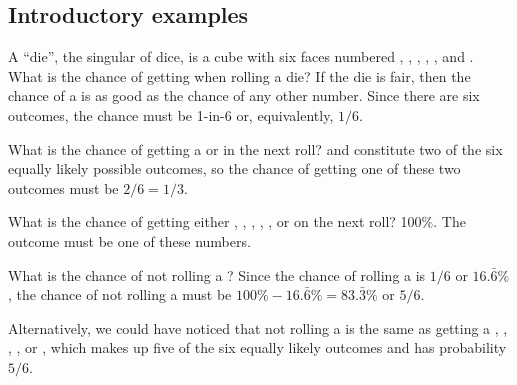 \subsection{Introductory examples}

\begin{examplewrap}
\begin{nexample}{A ``die'', the singular of dice, is a cube with six faces numbered , , , , , and . What is the chance of getting  when rolling a die?}\label{probOf1}
If the die is fair, then the chance of a  is as good as the chance of any other number. Since there are six outcomes, the chance must be 1-in-6 or, equivalently, $1/6$.
\end{nexample}
\end{examplewrap}

\begin{examplewrap}
\begin{nexample}{What is the chance of getting a  or  in the next roll?}\label{probOf1Or2}
 and  constitute two of the six equally likely possible outcomes, so the chance of getting one of these two outcomes must be $2/6 = 1/3$.
\end{nexample}
\end{examplewrap}

\begin{examplewrap}
\begin{nexample}{What is the chance of getting either , , , , , or  on the next roll?}\label{probOf123456}
100\%. The outcome must be one of these numbers.
\end{nexample}
\end{examplewrap}

\begin{examplewrap}
\begin{nexample}{What is the chance of not rolling a ?}\label{probNot2}
Since the chance of rolling a  is $1/6$ or $16.\bar{6}\%$, the chance of not rolling a  must be $100\% - 16.\bar{6}\%=83.\bar{3}\%$ or $5/6$.

Alternatively, we could have noticed that not rolling a  is the same as getting a , , , , or , which makes up five of the six equally likely outcomes and has probability $5/6$.
\end{nexample}
\end{examplewrap}

